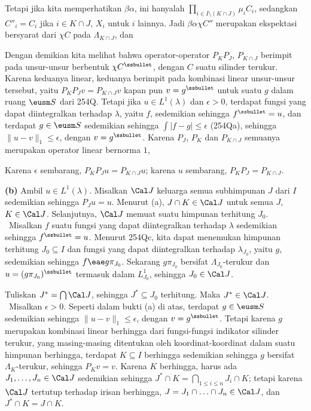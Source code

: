 {

\noindent Tetapi jika kita memperhatikan $\beta\alpha$, ini hanyalah
$\prod_{i\in I\setminus(K\cap J)}\mu_iC_i$, sedangkan $C''_i=C_i$ jika
$i\in K\cap J$,
$X_i$ untuk $i$ lainnya. Jadi $\beta\alpha\chi C''$ merupakan ekspektasi
bersyarat dari $\chi C$ pada $\Lambda_{K\cap J}$, dan


\medskip

 Dengan demikian kita melihat bahwa operator-operator $P_KP_J$, $P_{K\cap J}$
berimpit pada unsur-unsur berbentuk $\chi C^{\ssbullet}$, dengan $C$ suatu
silinder terukur. Karena keduanya linear, keduanya berimpit pada
kombinasi linear unsur-unsur tersebut, yaitu $P_KP_Jv=P_{K\cap J}v$ kapan pun
$v=g^{\ssbullet}$ untuk suatu $g$ dalam ruang $\eusm S$ dari 254Q. Tetapi jika
$u\in L^1(\lambda)$ dan $\epsilon>0$, terdapat fungsi yang dapat diintegralkan terhadap
$\lambda$, yaitu $f$, sedemikian sehingga $f^{\ssbullet}=u$, dan terdapat $g\in\eusm S$
sedemikian sehingga $\int|f-g|\le\epsilon$ (254Qa), sehingga
$\|u-v\|_1\le\epsilon$, dengan $v=g^{\ssbullet}$. Karena $P_J$, $P_K$
dan $P_{K\cap J}$ semuanya merupakan operator linear bernorma $1$,


\noindent Karena $\epsilon$ sembarang, $P_KP_Ju=P_{K\cap J}u$; karena $u$
sembarang, $P_KP_J=P_{K\cap J}$.

\medskip

{\bf (b)} Ambil $u\in L^1(\lambda)$. Misalkan $\Cal J$ keluarga semua
subhimpunan $J$ dari $I$ sedemikian sehingga $P_Ju=u$. Menurut (a), $J\cap K\in\Cal J$ untuk
semua $J$, $K\in\Cal J$. Selanjutnya, $\Cal J$ memuat suatu himpunan terhitung $J_0$.
\Prf\ Misalkan $f$ suatu fungsi yang dapat diintegralkan terhadap $\lambda$ sedemikian sehingga
$f^{\ssbullet}=u$. Menurut 254Qc, kita dapat menemukan himpunan terhitung
$J_0\subseteq I$ dan fungsi yang dapat diintegralkan terhadap $\lambda_{J_0}$, yaitu $g$, sedemikian sehingga
$f\eae g\pi_{J_0}$. Sekarang $g\pi_{J_0}$ bersifat $\Lambda_{J_0}$-terukur
dan $u=(g\pi_{J_0})^{\ssbullet}$ termasuk dalam $L^1_{J_0}$, sehingga
$J_0\in\Cal J$.\ \Qed

Tuliskan $J^*=\bigcap\Cal J$, sehingga $J^*\subseteq J_0$ terhitung.
Maka $J^*\in\Cal J$. \Prf\ Misalkan $\epsilon>0$. Seperti dalam bukti (a)
di atas, terdapat $g\in\eusm S$ sedemikian sehingga $\|u-v\|_1\le\epsilon$, dengan
$v=g^{\ssbullet}$. Tetapi karena $g$ merupakan kombinasi linear berhingga dari
fungsi-fungsi indikator silinder terukur, yang masing-masing ditentukan oleh
koordinat-koordinat dalam suatu
himpunan berhingga, terdapat $K\subseteq I$ berhingga sedemikian sehingga
$g$ bersifat $\Lambda_K$-terukur, sehingga $P_Kv=v$.
Karena $K$ berhingga, harus ada $J_1,\ldots,J_n\in\Cal J$ sedemikian sehingga
$J^*\cap K=\bigcap_{1\le i\le n}J_i\cap K$; tetapi karena $\Cal J$ tertutup
terhadap irisan berhingga, $J=J_1\cap\ldots\cap J_n\in\Cal J$, dan
$J^*\cap K=J\cap K$.

}
